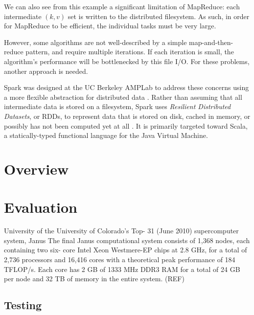 \documentclass{article}
\begin{document}
We can also see from this example a significant limitation of MapReduce: each
intermediate $(k, v)$ set is written to the distributed filesystem.  As such,
in order for MapReduce to be efficient, the individual tasks must be very
large.

However, some algorithms are not well-described by a simple map-and-then-reduce
pattern, and require multiple iterations.  If each iteration is small, the
algorithm's performance will be bottlenecked by this file I/O. For these
problems, another approach is needed.

Spark was designed at the UC Berkeley AMPLab to address these concerns using a
more flexible abstraction for distributed data \citep{zaharia}. Rather than
assuming that all intermediate data is stored on a filesystem, Spark uses
\emph{Resilient Distributed Datasets}, or RDDs, to represent data that is
stored on disk, cached in memory, or possibly has not been computed yet at all
\citep{zaharia_rdd}.  It is primarily targeted toward Scala, a statically-typed
functional language for the Java Virtual Machine.

\section{Overview}

\section{Evaluation}
University of the University of Colorado's Top-
31 (June 2010) supercomputer system, Janus
The final Janus computational
system consists of 1,368 nodes, each containing two six-
core Intel Xeon Westmere-EP chips at 2.8 GHz, for a total
of 2,736 processors and 16,416 cores with a theoretical
peak performance of 184 TFLOP/s. Each core has 2
GB of 1333 MHz DDR3 RAM for a total of 24 GB per
node and 32 TB of memory in the entire system. (REF)

\subsection{Testing}
\end{document}
